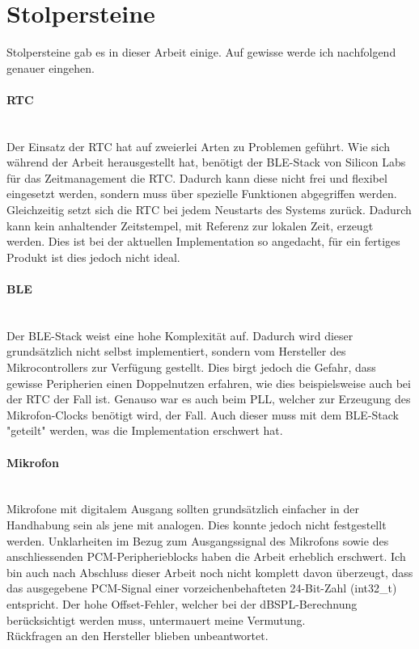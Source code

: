 \documentclass[12pt]{article}
\begin{document}
	\newpage
	\section{Stolpersteine}
	Stolpersteine gab es in dieser Arbeit einige. Auf gewisse werde ich nachfolgend genauer eingehen.
	\paragraph{RTC}\mbox{}\\
	Der Einsatz der RTC hat auf zweierlei Arten zu Problemen geführt. Wie sich während der Arbeit herausgestellt hat, benötigt der BLE-Stack von Silicon Labs für das Zeitmanagement die RTC. Dadurch kann diese nicht frei und flexibel eingesetzt werden, sondern muss über spezielle Funktionen abgegriffen werden. Gleichzeitig setzt sich die RTC bei jedem Neustarts des Systems zurück. Dadurch kann kein anhaltender Zeitstempel, mit Referenz zur lokalen Zeit, erzeugt werden. Dies ist bei der aktuellen Implementation so angedacht, für ein fertiges Produkt ist dies jedoch nicht ideal.
	\paragraph{BLE}\mbox{}\\
	Der BLE-Stack weist eine hohe Komplexität auf. Dadurch wird dieser grund\-sätzlich nicht selbst implementiert, sondern vom Hersteller des Mikrocontrollers zur Verfügung gestellt. Dies birgt jedoch die Gefahr, dass gewisse Peripherien einen Doppelnutzen erfahren, wie dies beispielsweise auch bei der RTC der Fall ist. Genauso war es auch beim PLL, welcher zur Erzeugung des Mikrofon-Clocks benötigt wird, der Fall. Auch dieser muss mit dem BLE-Stack "geteilt" werden, was die Implementation erschwert hat. 
	\paragraph{Mikrofon}\mbox{}\\
	Mikrofone mit digitalem Ausgang sollten grundsätzlich einfacher in der Handhabung sein als jene mit analogen. Dies konnte jedoch nicht festgestellt werden. Unklarheiten im Bezug zum Ausgangssignal des Mikrofons sowie des anschliessenden PCM-Peripherieblocks haben die Arbeit erheblich erschwert. Ich bin auch nach Abschluss dieser Arbeit noch nicht komplett davon über\-zeugt, dass das ausgegebene PCM-Signal einer vorzeichenbehafteten 24-Bit-Zahl (int32\_t) entspricht. Der hohe Offset-Fehler, welcher bei der dBSPL-Berechnung berücksichtigt werden muss, untermauert meine Vermutung. \\Rückfragen an den Hersteller blieben unbeantwortet.
	
\end{document}

